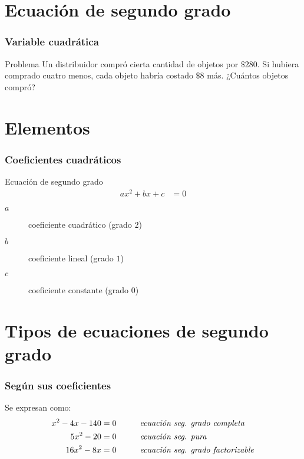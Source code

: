 \documentclass[12pt,spanish,x11names]{beamer}
\title{\talktitle}
\subtitle{\talksubtitle}
\author{\talkauthor}
\institute{\talkaffiliation}
\date{\footnotesize{\emph{\href{\talkblog}{\talkemail}}}}
\begin{document}
\begin{frame}
\titlepage
\end{frame}
\section{Ecuación de segundo grado}
\begin{frame}
  \frametitle{Variable cuadrática}
  \begin{exampleblock}{Problema}
    Un distribuidor compró cierta cantidad de objetos por $\$280$. Si hubiera
    comprado cuatro menos, cada objeto habría costado $\$8$ más. ¿Cuántos
    objetos compró?
  \end{exampleblock}
\end{frame}
\section{Elementos}
\begin{frame}
  \frametitle{Coeficientes cuadráticos}
  \begin{block}{Ecuación de segundo grado}
    \begin{align*}
      \label{eq:1}
      ax^2+bx+c&=0
    \end{align*}
    \begin{description}
    \item[$a$] coeficiente cuadrático (grado $2$)
    \item[$b$] coeficiente lineal (grado $1$)
    \item[$c$] coeficiente constante (grado $0$)
    \end{description}
  \end{block}
\end{frame}
\section{Tipos de ecuaciones de segundo grado}
\begin{frame}
  \frametitle{Según sus coeficientes}
  \begin{exampleblock}{Se expresan como:}
    \begin{align*}
      x^2-4x-140&=0\hspace{1cm}\text{\emph{ecuación seg. grado completa}}\\
      5x^2-20&=0\hspace{1cm}\text{\emph{ecuación seg. pura}}\\
      16x^2-8x&=0\hspace{1cm}\text{\emph{ecuación seg. grado factorizable}}
    \end{align*}
  \end{exampleblock}
\end{frame}
\end{document}
